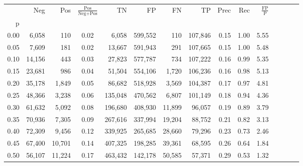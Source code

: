 \begin{tabular}{rrrcrrrrrrrrrrr}
\toprule
{} &     Neg &     Pos & $\frac{\text{Pos}}{\text{Neg}+\text{Pos}}$ &       TN &       FP &       FN &       TP &  Prec &   Rec & $\frac{\text{FP}}{\text{P}}$ \\
p    &         &         &                                            &          &          &          &          &       &       &                              \\
\midrule
0.00 &   6,058 &     110 &                                       0.02 &    6,058 &  599,552 &      110 &  107,846 &  0.15 &  1.00 &                         5.55 \\
0.05 &   7,609 &     181 &                                       0.02 &   13,667 &  591,943 &      291 &  107,665 &  0.15 &  1.00 &                         5.48 \\
0.10 &  14,156 &     443 &                                       0.03 &   27,823 &  577,787 &      734 &  107,222 &  0.16 &  0.99 &                         5.35 \\
0.15 &  23,681 &     986 &                                       0.04 &   51,504 &  554,106 &    1,720 &  106,236 &  0.16 &  0.98 &                         5.13 \\
0.20 &  35,178 &   1,849 &                                       0.05 &   86,682 &  518,928 &    3,569 &  104,387 &  0.17 &  0.97 &                         4.81 \\
0.25 &  48,366 &   3,238 &                                       0.06 &  135,048 &  470,562 &    6,807 &  101,149 &  0.18 &  0.94 &                         4.36 \\
0.30 &  61,632 &   5,092 &                                       0.08 &  196,680 &  408,930 &   11,899 &   96,057 &  0.19 &  0.89 &                         3.79 \\
0.35 &  70,936 &   7,305 &                                       0.09 &  267,616 &  337,994 &   19,204 &   88,752 &  0.21 &  0.82 &                         3.13 \\
0.40 &  72,309 &   9,456 &                                       0.12 &  339,925 &  265,685 &   28,660 &   79,296 &  0.23 &  0.73 &                         2.46 \\
0.45 &  67,400 &  10,701 &                                       0.14 &  407,325 &  198,285 &   39,361 &   68,595 &  0.26 &  0.64 &                         1.84 \\
0.50 &  56,107 &  11,224 &                                       0.17 &  463,432 &  142,178 &   50,585 &   57,371 &  0.29 &  0.53 &                         1.32 \\

\end{tabular}
